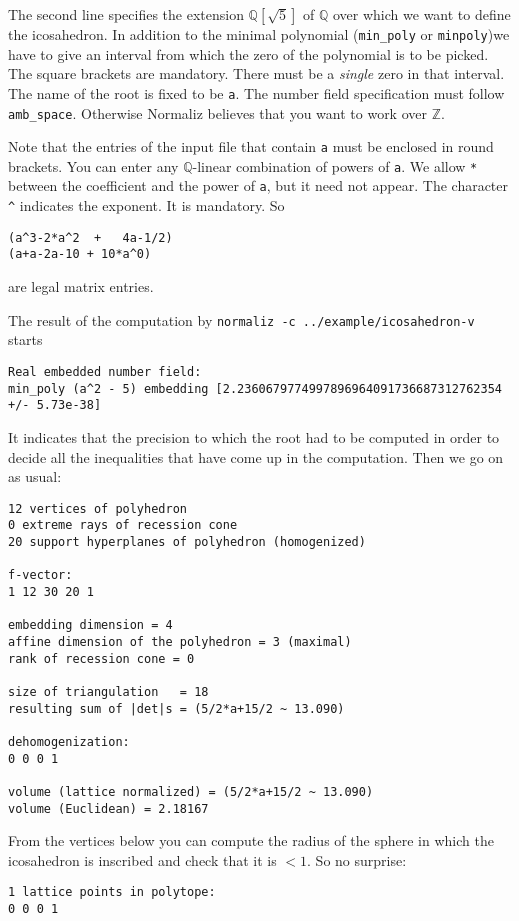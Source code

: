 \documentclass[12pt,a4paper]{scrartcl}
\theoremstyle{definition}
\def\ZZ{{\mathbb Z}}
\def\QQ{{\mathbb Q}}
\begin{document}
{The second line specifies the extension $\QQ[\sqrt 5]$ of $\QQ$ over which we want to define the icosahedron. In addition to the minimal polynomial (\verb|min_poly| or \verb|minpoly|)we have to give an interval from which the zero of the polynomial is to be picked. The square brackets are mandatory. There must be a \emph{single} zero in that interval. The name of the root is fixed to be \verb|a|. The number field specification must follow \verb|amb_space|. Otherwise Normaliz believes that you want to work over $\ZZ$. 

Note that the entries of the input file that contain \verb|a| must be enclosed in round brackets. You can enter any $\QQ$-linear combination of powers of \verb|a|. We allow \verb|*| between the coefficient and the power of \verb|a|, but it need not appear. The character \verb|^| indicates the exponent. It is mandatory. So
\begin{Verbatim}
(a^3-2*a^2  +   4a-1/2)
(a+a-2a-10 + 10*a^0)
\end{Verbatim}
are legal matrix entries.

The result of the computation by \verb|normaliz -c ../example/icosahedron-v| starts
\begin{Verbatim}
Real embedded number field:
min_poly (a^2 - 5) embedding [2.2360679774997896964091736687312762354 +/- 5.73e-38]
\end{Verbatim}
It indicates that the precision to which the root had to be computed in order to decide all the inequalities that have come up in the computation. Then we go on as usual:

\begin{Verbatim}
12 vertices of polyhedron
0 extreme rays of recession cone
20 support hyperplanes of polyhedron (homogenized)

f-vector:
1 12 30 20 1 

embedding dimension = 4
affine dimension of the polyhedron = 3 (maximal)
rank of recession cone = 0

size of triangulation   = 18
resulting sum of |det|s = (5/2*a+15/2 ~ 13.090)

dehomogenization:
0 0 0 1 

volume (lattice normalized) = (5/2*a+15/2 ~ 13.090)
volume (Euclidean) = 2.18167
\end{Verbatim}
From the vertices below you can compute the radius of the sphere in which the icosahedron is inscribed and check that it is $<1$. So no surprise:
\begin{Verbatim}
1 lattice points in polytope:
0 0 0 1


\end{Verbatim}}
\end{document}
